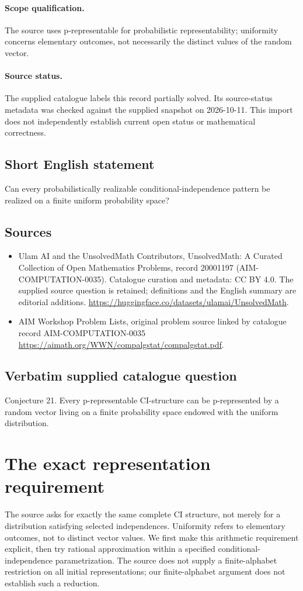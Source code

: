 \documentclass[11pt]{article}
\begin{document}
\paragraph{Scope qualification.}
The source uses p-representable for probabilistic representability; uniformity concerns elementary outcomes, not necessarily the distinct values of the random vector.
\paragraph{Source status.}
The supplied catalogue labels this record partially solved. Its source-status metadata was checked against the supplied snapshot on 2026-10-11. This import does not independently establish current open status or mathematical correctness.
\subsection{Short English statement}
Can every probabilistically realizable conditional-independence pattern be realized on a finite uniform probability space?
\subsection{Sources}
\begin{itemize}
\item[S1] Ulam AI and the UnsolvedMath Contributors, UnsolvedMath: A Curated Collection of Open Mathematics Problems, record 20001197 (AIM-COMPUTATION-0035). Catalogue curation and metadata: CC BY 4.0. The supplied source question is retained; definitions and the English summary are editorial additions.
\url{https://huggingface.co/datasets/ulamai/UnsolvedMath}.
\item[S2] AIM Workshop Problem Lists, original problem source linked by catalogue record AIM-COMPUTATION-0035
\url{https://aimath.org/WWN/compalgstat/compalgstat.pdf}.
\end{itemize}
\subsection{Verbatim supplied catalogue question}
Conjecture 21. Every p-representable CI-structure can be p-represented by a random vector living on a finite probability space endowed with the uniform distribution.

\section{The exact representation requirement}
The source asks for exactly the same complete CI structure, not merely
for a distribution satisfying selected independences. Uniformity refers
to elementary outcomes, not to distinct vector values. We first make this
arithmetic requirement explicit, then try rational approximation within
a specified conditional-independence parametrization. The source does
not supply a finite-alphabet restriction on all initial representations;
our finite-alphabet argument does not establish such a reduction.
\end{document}
